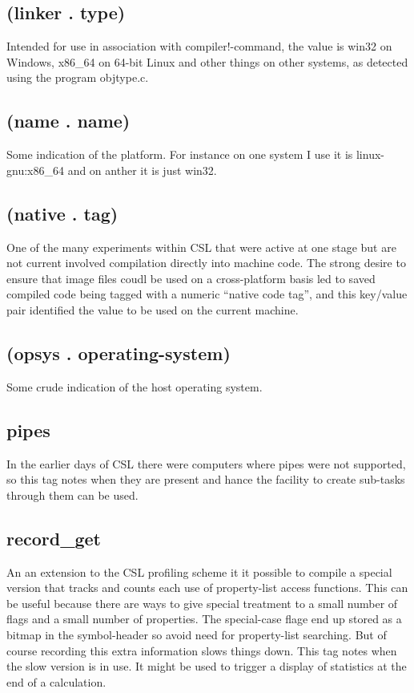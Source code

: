 \documentclass[a4paper,11pt]{article}
\begin{document}
{\subsection{\ttfamily (linker . type)}
   Intended for use in association with {\ttfamily compiler!-command}, the value
   is {\ttfamily win32} on Windows, {\ttfamily x86\_64} on 64-bit Linux and
   other things on other systems, as detected using the program {\ttfamily
   objtype.c}.

\subsection{\ttfamily (name . name)}
   Some indication of the platform. For instance on one system I use it
   is {\ttfamily linux-gnu:x86\_64} and on anther it is just {\ttfamily win32}.

\subsection{\ttfamily (native . tag)}
   One of the many experiments within CSL that were active at one stage but are
   not current involved compilation directly into machine code. The strong
   desire to ensure that image files coudl be used on a cross-platform basis
   led to saved compiled code being tagged with a numeric ``native code tag'',
   and this key/value pair identified the value to be used on the current
   machine.

\subsection{\ttfamily (opsys . operating-system)}
   Some crude indication of the host operating system.

\subsection{\ttfamily pipes}
   In the earlier days of CSL there were computers where pipes were not
   supported, so this tag notes when they are present and hance the facility
   to create sub-tasks through them can be used.

\subsection{\ttfamily record\_get}
   An an extension to the CSL profiling scheme it it possible to compile
   a special version that tracks and counts each use of property-list access
   functions. This can be useful because there are ways to give special
   treatment to a small number of flags and a small number of properties. The
   special-case flage end up stored as a bitmap in the symbol-header so avoid
   need for property-list searching. But of course recording this extra
   information slows things down. This tag notes when the slow version is
   in use. It might be used to trigger a display of statistics at the end of
   a calculation.

}
\end{document}

